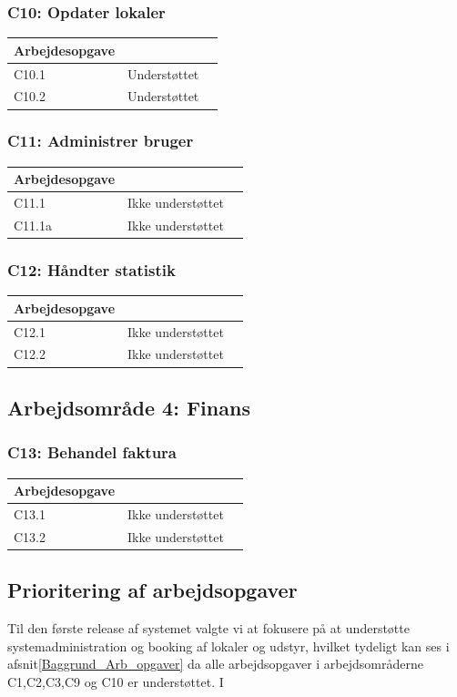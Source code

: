 \subsubsection{C10: Opdater lokaler}
\begin{tabular}{ | l | r | p{} |}
	\hline
	Arbejdesopgave & \\ 
\hline
	C10.1 & Understøttet \\ 
\hline
	C10.2 & Understøttet \\ 
\hline
\end{tabular}

\subsubsection{C11: Administrer bruger}
\begin{tabular}{ | l | r | p{} |}
	\hline
	Arbejdesopgave & \\ 
\hline
	C11.1 & Ikke understøttet \\ 
\hline
	C11.1a & Ikke understøttet \\ 
\hline
\end{tabular}

\subsubsection{C12: Håndter statistik}
\begin{tabular}{ | l | r | p{} |}
	\hline
	Arbejdesopgave & \\ 
\hline
	C12.1 & Ikke understøttet \\ 
\hline
	C12.2 & Ikke understøttet \\ 
\hline
\end{tabular}

\subsection{Arbejdsområde 4: Finans}
\label{Baggrund_Arb_opgaver_Finas}
\subsubsection{C13: Behandel faktura}
\begin{tabular}{ | l | r | p{} |}
	\hline
	Arbejdesopgave & \\ 
\hline
	C13.1 & Ikke understøttet \\ 
\hline
	C13.2 & Ikke understøttet \\ 
\hline
\end{tabular}
\subsection{Prioritering af arbejdsopgaver}
\label{Baggrund_Arb_opgaver_Prio_Arb_Opg}
Til den første release af systemet valgte vi at fokusere på at understøtte systemadministration og booking af lokaler og udstyr, hvilket tydeligt kan ses i afsnit\ref{Baggrund_Arb_opgaver} da alle arbejdsopgaver i arbejdsområderne C1,C2,C3,C9 og C10 er understøttet. I

